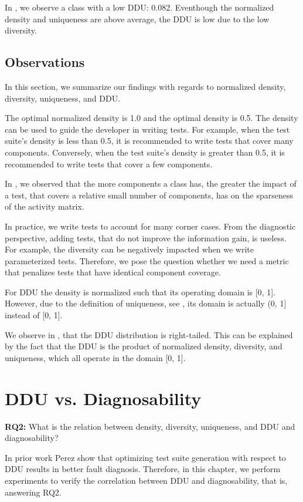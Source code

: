 \documentclass[twoside,a4paper,11pt]{memoir}
\begin{document}
In , we observe a class with a low DDU: 0.082.
Eventhough the normalized density and uniqueness are above average, the DDU is low due to the low diversity.

\section{Observations}
In this section, we summarize our findings with regards to normalized density, diversity, uniqueness, and DDU.

The optimal normalized density is 1.0 and the optimal density is 0.5.
The density can be used to guide the developer in writing tests.
For example, when the test suite's density is less than 0.5, it is recommended to write tests that cover many components.
Conversely, when the test suite's density is greater than 0.5, it is recommended to write tests that cover a few components.

In , we observed that the more components a class has, the greater the impact of a test, that covers a relative small number of components, has on the sparseness of the activity matrix.

In practice, we write tests to account for many corner cases.
From the diagnostic perspective, adding tests, that do not improve the information gain, is useless.
For example, the diversity can be negatively impacted when we write parameterized tests.
Therefore, we pose the question whether we need a metric that penalizes tests that have identical component coverage.

For DDU the density is normalized such that its operating domain is [0, 1].
However, due to the definition of uniqueness, see , its domain is actually (0, 1] instead of [0, 1].

We observe in , that the DDU distribution is right-tailed.
This can be explained by the fact that the DDU is the product of normalized density, diversity, and uniqueness, which all operate in the domain [0, 1].

%



\chapter{DDU vs. Diagnosability}
\label{ch:rq2}
\begin{framed}
\noindent
\textbf{RQ2:} What is the relation between density, diversity, uniqueness, and DDU and diagnosability?
\end{framed}
In prior work Perez \etal \cite{DBLP:conf/icse/PerezAD17} show that optimizing test suite generation with respect to DDU results in better fault diagnosis.
Therefore, in this chapter, we perform experiments to verify the correlation between DDU and diagnosability, that is, answering RQ2.
\end{document}
